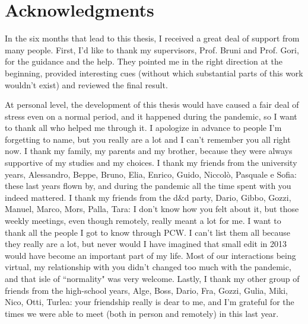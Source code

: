 \thispagestyle{plain}
\section*{Acknowledgments}
In the six months that lead to this thesis, I received a great deal of support from many people.
First, I'd like to thank my supervisors, Prof. Bruni and Prof. Gori, for the guidance and the help. They pointed me in the right direction at the beginning, provided interesting cues (without which substantial parts of this work wouldn't exist) and reviewed the final result.

At personal level, the development of this thesis would have caused a fair deal of stress even on a normal period, and it happened during the pandemic, so I want to thank all who helped me through it. I apologize in advance to people I'm forgetting to name, but you really are a lot and I can't remember you all right now.
I thank my family, my parents and my brother, because they were always supportive of my studies and my choices.
I thank my friends from the university years, Alessandro, Beppe, Bruno, Elia, Enrico, Guido, Niccolò, Pasquale e Sofia: these last years flown by, and during the pandemic all the time spent with you indeed mattered.
I thank my friends from the d\&d party, Dario, Gibbo, Gozzi, Manuel, Marco, Mors, Palla, Tara: I don't know how you felt about it, but those weekly meetings, even though remotely, really meant a lot for me.
I want to thank all the people I got to know through PCW. I can't list them all because they really are a lot, but never would I have imagined that small edit in 2013 would have become an important part of my life. Most of our interactions being virtual, my relationship with you didn't changed too much with the pandemic, and that isle of ``normality" was very welcome.
Lastly, I thank my other group of friends from the high-school years, Alge, Boss, Dario, Fra, Gozzi, Gulia, Miki, Nico, Otti, Turlea: your friendship really is dear to me, and I'm grateful for the times we were able to meet (both in person and remotely) in this last year.
